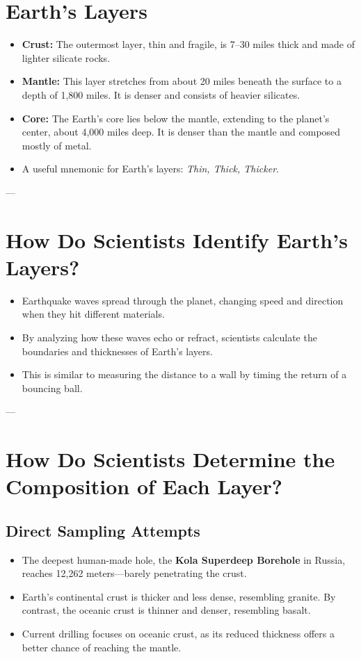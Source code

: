 \documentclass[12pt]{article}
\begin{document}
\section*{Earth's Layers}
\begin{itemize}
    \item \textbf{Crust:} The outermost layer, thin and fragile, is 7–30 miles thick and made of lighter silicate rocks.
    \item \textbf{Mantle:} This layer stretches from about 20 miles beneath the surface to a depth of 1,800 miles. It is denser and consists of heavier silicates.
    \item \textbf{Core:} The Earth's core lies below the mantle, extending to the planet's center, about 4,000 miles deep. It is denser than the mantle and composed mostly of metal.
    \item A useful mnemonic for Earth's layers: \textit{Thin, Thick, Thicker}.
\end{itemize}

---

\section*{How Do Scientists Identify Earth's Layers?}
\begin{itemize}
    \item Earthquake waves spread through the planet, changing speed and direction when they hit different materials.
    \item By analyzing how these waves echo or refract, scientists calculate the boundaries and thicknesses of Earth's layers.
    \item This is similar to measuring the distance to a wall by timing the return of a bouncing ball.
\end{itemize}

---

\section*{How Do Scientists Determine the Composition of Each Layer?}
\subsection*{Direct Sampling Attempts}
\begin{itemize}
    \item The deepest human-made hole, the \textbf{Kola Superdeep Borehole} in Russia, reaches 12,262 meters—barely penetrating the crust.
    \item Earth's continental crust is thicker and less dense, resembling granite. By contrast, the oceanic crust is thinner and denser, resembling basalt.
    \item Current drilling focuses on oceanic crust, as its reduced thickness offers a better chance of reaching the mantle.
\end{itemize}
\end{document}
